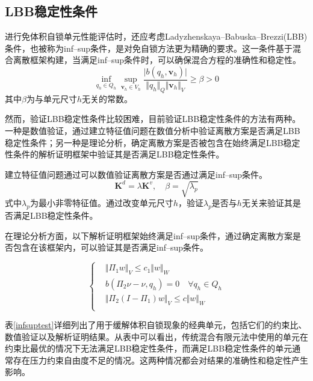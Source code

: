 \subsection{LBB稳定性条件}
进行免体积自锁单元性能评估时，还应考虑Ladyzhenskaya--Babuska--Brezzi(LBB)条件，也被称为inf--sup条件\cite{babuska1997a,bathe1996}，是对免自锁方法更为精确的要求。这一条件基于混合离散框架构建，当满足inf--sup条件时，可以确保混合方程的准确性和稳定性。
\begin{equation}\label{infsup}
    \inf_{q_h \in Q_h} \sup_{\boldsymbol v_h \in V_h} \frac{\vert b(q_h,\boldsymbol v_h) \vert}{\Vert q_h \Vert_Q \Vert \boldsymbol v_h \Vert_V} \ge \beta > 0
\end{equation}
其中$\beta$为与单元尺寸$h$无关的常数。

然而，验证LBB稳定性条件比较困难，目前验证LBB稳定性条件的方法有两种。一种是数值验证，通过建立特征值问题\cite{chapelle1993}在数值分析中验证离散方案是否满足LBB稳定性条件；另一种是理论分析，确定离散方案是否被包含在始终满足LBB稳定性条件的解析证明框架\cite{chapelle1993}中验证其是否满足LBB稳定性条件。

建立特征值问题通过可以数值验证离散方案是否通过满足inf--sup条件。
\begin{equation}\label{eigenvalue}
    \boldsymbol K^d=\lambda\boldsymbol K^v,\quad \beta=\sqrt{\lambda_p}
\end{equation}
式中$\lambda_p$为最小非零特征值。通过改变单元尺寸$h$，验证$\lambda_p$是否与$h$无关来验证其是否满足LBB稳定性条件。

在理论分析方面，以下解析证明框架始终满足inf--sup条件，通过确定离散方案是否包含在该框架内，可以验证其是否满足inf--sup条件。

\begin{equation}\label{analy}
    \begin{cases}
        &\Vert\Pi_1 w\Vert_V \le c_1\Vert w\Vert_W \\
        &b(\Pi_2\nu-\nu,q_h)=0 \quad \forall q_h \in Q_h\\
        &\Vert \Pi_2(I-\Pi_1)w \Vert_V \le c \Vert w\Vert_W \\
    \end{cases}
\end{equation}

表\ref{infsuptest}详细列出了用于缓解体积自锁现象的经典单元，包括它们的约束比、数值验证以及解析证明结果。从表中可以看出，传统混合有限元法中使用的单元在约束比最优的情况下无法满足LBB稳定性条件，而满足LBB稳定性条件的单元通常存在压力约束自由度不足的情况。这两种情况都会对结果的准确性和稳定性产生影响。

